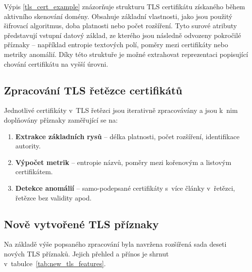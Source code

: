 Výpis \ref{tls_cert_example} znázorňuje strukturu TLS certifikátu získaného během aktivního skenování domény. Obsahuje základní vlastnosti, jako jsou použitý šifrovací algoritmus, doba platnosti nebo počet rozšíření. Tyto surové atributy představují vstupní datový základ, ze kterého jsou následně odvozeny pokročilé příznaky – například entropie textových polí, poměry mezi certifikáty nebo metriky anomálií. Díky této struktuře je možné extrahovat reprezentaci popisující chování certifikátu na vyšší úrovni.


\subsection*{Zpracování TLS řetězce certifikátů}

Jednotlivé certifikáty v~TLS řetězci jsou iterativně zpracovávány a jsou k~nim doplňovány příznaky zaměřující se na:

\begin{enumerate}
    \item \textbf{Extrakce základních rysů} – délka platnosti, počet rozšíření, identifikace autority.
    \item \textbf{Výpočet metrik} – entropie názvů, poměry mezi kořenovým a listovým certifikátem.
    \item \textbf{Detekce anomálií} – samo-podepsané certifikáty s~více články v~řetězci, řetězce bez validity apod.
\end{enumerate}


\subsection*{Nově vytvořené TLS příznaky}

Na základě výše popsaného zpracování byla navržena rozšířená sada deseti nových TLS příznaků. Jejich přehled a přínos je shrnut v~tabulce~\ref{tab:new_tls_features}.

